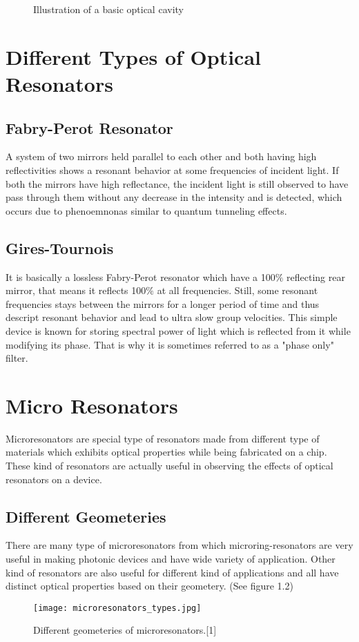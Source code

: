 \begin{figure}[h]
\centering
{}
\caption{Illustration of a basic optical cavity}
\end{figure}

\newpage
\section{Different Types of Optical Resonators}
\subsection{Fabry-Perot Resonator}
A system of two mirrors held parallel to each other and both having high reflectivities shows a resonant behavior at some frequencies of incident light. If both the mirrors have high reflectance, the incident light is still observed to have pass through them without any decrease in the intensity and is detected, which occurs due to phenoemnonas similar to quantum tunneling effects.

\subsection{Gires-Tournois}
It is basically a lossless Fabry-Perot resonator which have a 100$\%$ reflecting rear mirror, that means it reflects 100$\%$ at all frequencies. Still, some resonant frequencies stays between the mirrors for a longer period of time and thus descript resonant behavior and lead to ultra slow group velocities. This simple device is known for storing spectral power of light which is reflected from it while modifying its phase. That is why it is sometimes referred to as a "phase only" filter.


\section{Micro Resonators}
Microresonators are special type of resonators made from different type of materials which exhibits optical properties while being fabricated on a chip. These kind of resonators are actually useful in observing the effects of optical resonators on a device.
\subsection{Different Geometeries}
There are many type of microresonators from which microring-resonators are very useful in making photonic devices and have wide variety of application. Other kind of resonators are also useful for different kind of applications and all have distinct optical properties based on their geometery. (See figure 1.2)
\begin{figure}[h]
\centering
\texttt{[image: microresonators\_types.jpg]}
\caption{Different geometeries of microresonators.[1]}
\end{figure}

